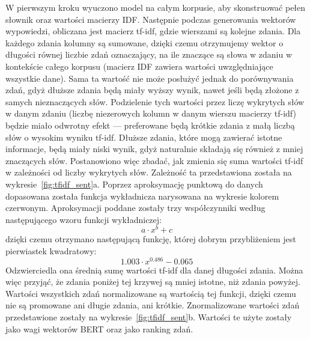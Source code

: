 		W pierwszym kroku wyuczono model na całym korpusie, aby skonstruować pełen słownik oraz wartości macierzy IDF\@.
		Następnie podczas generowania wektorów wypowiedzi, obliczana jest macierz tf-idf, gdzie wierszami są kolejne zdania.
		Dla każdego zdania kolumny są sumowane, dzięki czemu otrzymujemy wektor o długości równej liczbie zdań oznaczający,
			na ile znaczące są słowa w zdaniu w kontekście całego korpusu (macierz IDF zawiera wartości uwzględniające wszystkie dane).
		Sama ta wartość nie może posłużyć jednak do porównywania zdań, gdyż dłuższe zdania będą miały wyższy wynik, nawet jeśli będą złożone z samych nieznaczących słów.
		Podzielenie tych wartości przez liczę wykrytych słów w danym zdaniu (liczbę niezerowych kolumn w danym wierszu macierzy tf-idf) będzie miało odwrotny efekt
			--- preferowane będą krótkie zdania z małą liczbą słów o wysokim wyniku tf-idf.
		Dłuższe zdania, które mogą zawierać istotne informacje, będą miały niski wynik, gdyż naturalnie składają się również z mniej znaczących słów.
		Postanowiono więc zbadać, jak zmienia się suma wartości tf-idf w zależności od liczby wykrytych słów.
		Zależność ta przedstawiona została na wykresie~\ref{fig:tfidf_sent}a.
		Poprzez aproksymację punktową do danych dopasowana została funkcja wykładnicza narysowana na wykresie kolorem czerwonym.
		Aproksymacji poddane zostały trzy współczynniki według następującego wzoru funkcji wykładniczej:
		\[a\cdot x^b + c\]
		dzięki czemu otrzymano następującą funkcję, której dobrym przybliżeniem jest pierwiastek kwadratowy:
		\[1.003\cdot x^{0.486} - 0.065\]
		Odzwierciedla ona średnią sumę wartości tf-idf dla danej długości zdania.
		Można więc przyjąć, że zdania poniżej tej krzywej są mniej istotne, niż zdania powyżej.
		Wartości wszystkich zdań normalizowane są wartością tej funkcji, dzięki czemu nie są promowane ani długie zdania, ani krótkie.
		Znormalizowane wartości zdań przedstawione zostały na wykresie~\ref{fig:tfidf_sent}b.
		Wartości te użyte zostały jako wagi wektorów BERT oraz jako ranking zdań.

